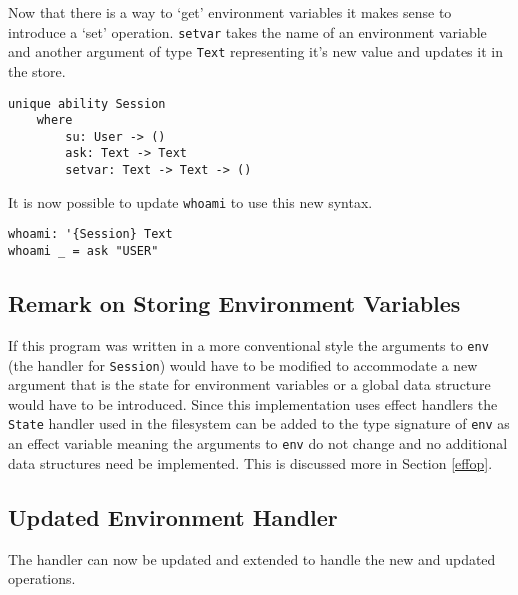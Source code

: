 \documentclass[logo,bsc,singlespacing,parskip]{infthesis}
\begin{document}
Now that there is a way to `get' environment variables
it makes sense to introduce a `set' operation. \texttt{setvar} takes the name
of an environment variable and another argument of type \texttt{Text}
representing it's new value and updates it in the store.

\begin{lstlisting}[language=unison]
unique ability Session
    where
        su: User -> ()
        ask: Text -> Text
        setvar: Text -> Text -> ()
\end{lstlisting}

It is now possible to update \texttt{whoami} to use this new syntax.

\begin{lstlisting}[language=unison]
whoami: '{Session} Text
whoami _ = ask "USER"
\end{lstlisting}

\subsection{Remark on Storing Environment Variables}

If this program was written in a more conventional style the arguments to
\texttt{env} (the handler for \texttt{Session}) would have to be modified to
accommodate a new argument that is the state for environment variables or a
global data structure would have to be introduced. Since this implementation
uses effect handlers the \texttt{State} handler used in the filesystem can be
added to the type signature of \texttt{env} as an effect variable meaning the
arguments to \texttt{env} do not change and no additional data structures need
be implemented. This is discussed more in Section \ref{effop}.

\subsection{Updated Environment Handler}

The handler can now be updated and extended to handle the new and updated operations.
\end{document}
